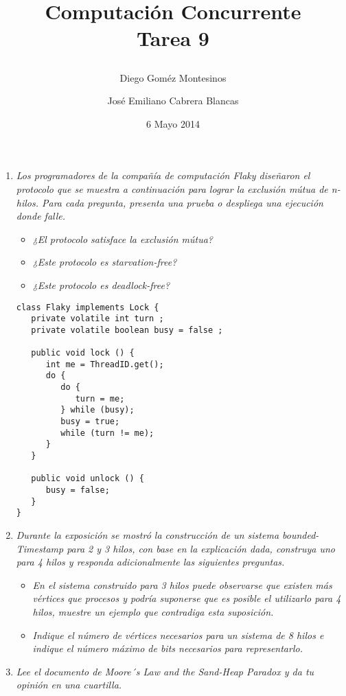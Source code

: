 \documentclass{article}
\title{ Computación Concurrente \\ \Large{Tarea 9}
\author{
  Diego Goméz Montesinos
  \and
  José Emiliano Cabrera Blancas
  }
\date{6 Mayo 2014}
}
\begin{document}
\maketitle
\begin{enumerate}
  
\item{
    \textsl{
      Los programadores de la compañía de computación Flaky diseñaron
      el protocolo que se muestra a continuación para lograr la
      exclusión mútua de n-hilos. Para cada pregunta, presenta una
      prueba o despliega una ejecución donde falle.
    }
      \begin{itemize}
        \item{\textsl{¿El protocolo satisface la exclusión mútua?}}
        \item{\textsl{¿Este protocolo es starvation-free?}}
        \item{\textsl{¿Este protocolo es deadlock-free?}}
      \end{itemize}

      \renewcommand{\lstlistingname}{}
\begin{lstlisting}[frame=single]
class Flaky implements Lock {
   private volatile int turn ;
   private volatile boolean busy = false ; 
   
   public void lock () {
      int me = ThreadID.get();
      do {
         do {
            turn = me;
         } while (busy);
         busy = true;
         while (turn != me);
      }
   }

   public void unlock () {
      busy = false;
   }
}
\end{lstlisting}
      
  }

\item{
    \textsl{
      Durante la exposición se mostró la construcción de un sistema
      bounded-Timestamp para 2 y 3 hilos, con base en la explicación
      dada, construya uno para 4 hilos y responda adicionalmente las
      siguientes preguntas.
    }
    \begin{itemize}
    \item{\textsl{
          En el sistema construido para 3 hilos puede observarse que
          existen más vértices que procesos y podría suponerse que es
          posible el utilizarlo para 4 hilos, muestre un ejemplo que
          contradiga esta suposición.
        }}

    \item{\textsl{
          Indique el número de vértices necesarios para un sistema de
          8 hilos e indique el número máximo de bits necesarios para
          representarlo.
        }}
    \end{itemize}
  }
    
\item{
    \textsl{
      Lee el documento de Moore´s Law and the Sand-Heap Paradox y da
      tu opinión en una cuartilla.
    }
  }
  
\end{enumerate}
\end{document}
